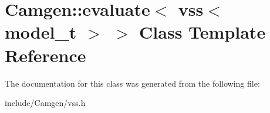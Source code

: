 \hypertarget{a00207}{\section{Camgen\-:\-:evaluate$<$ vss$<$ model\-\_\-t $>$ $>$ Class Template Reference}
\label{a00207}
}


The documentation for this class was generated from the following file\-:\begin{DoxyCompactItemize}
\item 
include/\-Camgen/vss.\-h\end{DoxyCompactItemize}
